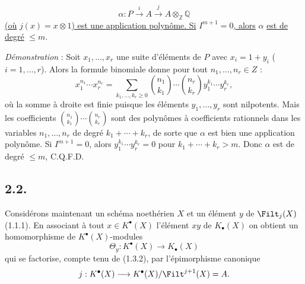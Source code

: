 
\[
\alpha:P\xrightarrow{i}A\xrightarrow{j}A\otimes_{\mathbb Z}\mathbb Q
\]
\uline{(où} $j(x)=x\otimes1$\uline{) est une application polynôme. Si} $I^{m+1}=0$\uline{, alors} $\alpha$ \uline{est de degré} $\leq m$.

\emph{Démonstration} : Soit $x_1,\ldots,x_r$ une suite d'éléments de $P$ avec $x_i=1+y_i$ ($i=1,\ldots,r$). Alors la formule binomiale donne pour tout $n_1,\ldots,n_r\in Z$ :
\begin{equation}\tag{2.1.5}
x_1^{n_1}\cdots x_r^{n_r}=
\sum_{k_1,\ldots,k_r\geq0}\binom{n_1}{k_1}\cdots\binom{n_r}{k_r}y_1^{k_1}\cdots y_r^{k_r},
\end{equation}
où la somme à droite est finie puisque les éléments $y_1,\ldots,y_r$ sont nilpotents. Mais les coefficients $\binom{n_1}{k_1}\cdots\binom{n_r}{k_r}$ sont des polynômes à coefficients rationnels dans les variables $n_1,\ldots,n_r$ de degré $k_1+\cdots+k_r$, de sorte que $\alpha$ est bien une application polynôme. Si $I^{m+1}=0$, alors $y_1^{k_1}\cdots y_r^{k_r}=0$ pour $k_1+\cdots+k_r>m$. Donc $\alpha$ est de degré $\leq m$, C.Q.F.D.

\subsection*{2.2.}
Considérons maintenant un schéma noethérien $X$ et un élément $y$ de $\Filt_j(X)$ (1.1.1). En associant à tout $x\in K^{\bullet}(X)$ l'élément $xy$ de $K_\bullet(X)$ on obtient un homomorphisme de $K^{\bullet}(X)$-modules
\[
\Theta_y:K^{\bullet}(X)\longrightarrow K_\bullet(X)
\]
qui se factorise, compte tenu de (1.3.2), par l'épimorphisme canonique
\[
j:K^{\bullet}(X)\longrightarrow K^{\bullet}(X)/\Filt^{j+1}(X)=A.
\]
